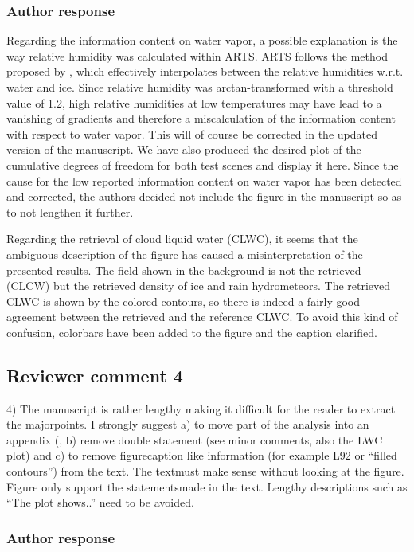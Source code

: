\documentclass[11pt]{scrartcl}
\begin{document}
\subsubsection*{Author response}

Regarding the information content on water vapor, a possible explanation is the
way relative humidity was calculated within ARTS. ARTS follows the method
proposed by \citet{}, which effectively interpolates between the relative
humidities w.r.t. water and ice. Since relative humidity was arctan-transformed
with a threshold value of 1.2, high relative humidities at low temperatures may
have lead to a vanishing of gradients and therefore a miscalculation of the
information content with respect to water vapor. This will of course be corrected
in the updated version of the manuscript. We have also produced the desired plot
of the cumulative degrees of freedom for both test scenes and display it here.
Since the cause for the low reported information content on water vapor has been
detected and corrected, the authors decided not include the figure in the manuscript
so as to not lengthen it further.

Regarding the retrieval of cloud liquid water (CLWC), it seems that the
ambiguous description of the figure has caused a misinterpretation of the
presented results. The field shown in the background is not the retrieved (CLCW)
but the retrieved density of ice and rain hydrometeors. The retrieved CLWC is
shown by the colored contours, so there is indeed a fairly good agreement
between the retrieved and the reference CLWC. To avoid this kind of confusion,
colorbars have been added to the figure and the caption clarified.

\subsection*{Reviewer comment 4}

4) The manuscript is rather lengthy making it difficult for the reader to
extract the majorpoints. I strongly suggest a) to move part of the analysis into
an appendix (, b) remove double statement (see minor comments, also the LWC plot)
and c) to remove figurecaption like information (for example L92 or “filled
contours”) from the text. The textmust make sense without looking at the figure.
Figure only support the statementsmade in the text. Lengthy descriptions such as
“The plot shows..” need to be avoided.

\subsubsection*{Author response}
\end{document}
